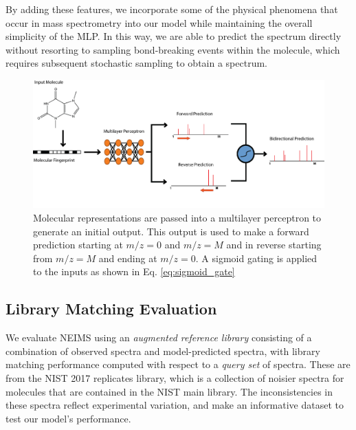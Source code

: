 By adding these features, we incorporate some of the physical phenomena that occur in mass spectrometry into our model while maintaining the overall simplicity of the MLP. In this way, we are able to predict the spectrum directly without resorting to sampling bond-breaking events within the molecule, which requires subsequent stochastic sampling to obtain a spectrum.


\begin{figure}[ht]
    \centering
    \includegraphics[width=0.9\linewidth]{./Model_prediction.png}
    \caption[Neural Electron Ionization MS Prediction Model]{Molecular representations are passed into a multilayer perceptron to generate an initial output. This output is used to make a forward prediction starting at $\textit{m/z}=0$ and $\textit{m/z}=M$ and in reverse starting from $\textit{m/z}=M$ and ending at $\textit{m/z}=0$. A sigmoid gating is applied to the inputs as shown in Eq. \ref{eq:sigmoid_gate}}
    \label{fig:model_prediction}
\end{figure}


\subsection{Library Matching Evaluation}\label{sec:library_matching_description}

We evaluate NEIMS using an \textit{augmented reference library} consisting of a combination of observed spectra and model-predicted spectra, with library matching performance computed with respect to a \textit{query set} of spectra. These are from the NIST 2017 replicates library, which is a collection of noisier spectra for molecules that are contained in the NIST main library. The inconsistencies in these spectra reflect experimental variation, and make an informative dataset to test our model's performance.


